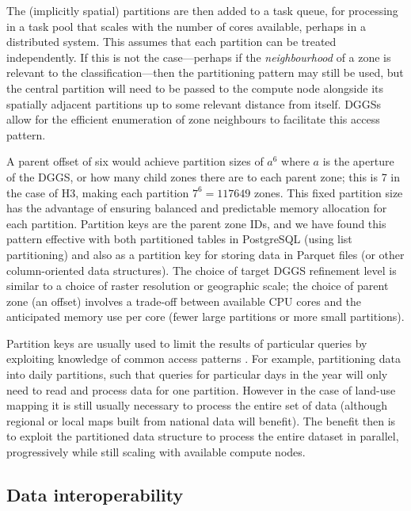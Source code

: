 \documentclass[]{interact}
\theoremstyle{plain}%
\theoremstyle{definition}
\theoremstyle{remark}
\begin{document}
The (implicitly spatial) partitions are then added to a task queue, for processing in a task pool that scales with the number of cores available, perhaps in a distributed system. This assumes that each partition can be treated independently. If this is not the case---perhaps if the \textit{neighbourhood} of a zone is relevant to the classification---then the partitioning pattern may still be used, but the central partition will need to be passed to the compute node alongside its spatially adjacent partitions up to some relevant distance from itself. \acp{DGGS} allow for the efficient enumeration of zone neighbours to facilitate this access pattern.

A parent offset of six would achieve partition sizes of $a^{6}$ where $a$ is the aperture of the \ac{DGGS}, or how many child zones there are to each parent zone; this is 7 in the case of H3, making each partition $7^{6}=117649$ zones. This fixed partition size has the advantage of ensuring balanced and predictable memory allocation for each partition. Partition keys are the parent zone IDs, and we have found this pattern effective with both partitioned tables in PostgreSQL (using list partitioning) and also as a partition key for storing data in Parquet files (or other column-oriented data structures). The choice of target \ac{DGGS} refinement level is similar to a choice of raster resolution or geographic scale; the choice of parent zone (an offset) involves a trade-off between available \acs{CPU} cores and the anticipated memory use per core (fewer large partitions or more small partitions).

Partition keys are usually used to limit the results of particular queries by exploiting knowledge of common access patterns \citep{abadi2008column}. For example, partitioning data into daily partitions, such that queries for particular days in the year will only need to read and process data for one partition. However in the case of land-use mapping it is still usually necessary to process the entire set of data (although regional or local maps built from national data will benefit). The benefit then is to exploit the partitioned data structure to process the entire dataset in parallel, progressively while still scaling with available compute nodes.

\subsection{Data interoperability}
\end{document}
